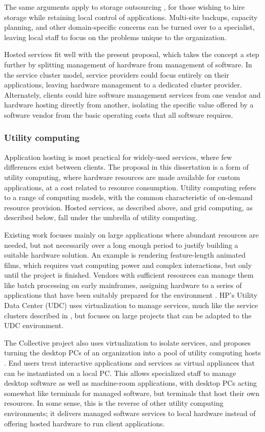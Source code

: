 The same arguments apply to storage outsourcing \cite{ng}, for those wishing to hire storage while retaining local control of applications. Multi-site backups, capacity planning, and other domain-specific concerns can be turned over to a specialist, leaving local staff to focus on the problems unique to the organization.

Hosted services fit well with the present proposal, which takes the concept a step further by splitting management of hardware from management of software. In the service cluster model, service providers could focus entirely on their applications, leaving hardware management to a dedicated cluster provider. Alternately, clients could hire software management services from one vendor and hardware hosting directly from another, isolating the specific value offered by a software vendor from the basic operating costs that all software requires.

\subsubsection{Utility computing}

Application hosting is most practical for widely-used services, where few differences exist between clients. The proposal in this dissertation is a form of utility computing, where hardware resources are made available for custom applications, at a cost related to resource consumption. Utility computing refers to a range of computing models, with the common characteristic of on-demand resource provision. Hosted services, as described above, and grid computing, as described below, fall under the umbrella of utility computing.

Existing work focuses mainly on large applications where abundant resources are needed, but not necessarily over a long enough period to justify building a suitable hardware solution. An example is rendering feature-length animated films, which requires vast computing power and complex interactions, but only until the project is finished. Vendors with sufficient resources can manage them like batch processing on early mainframes, assigning hardware to a series of applications that have been suitably prepared for the environment \cite{wilkes04}. HP's Utility Data Center (UDC) \cite{kallahalla} uses virtualization to manage services, much like the service clusters described in , but focuses on large projects that can be adapted to the UDC environment.

The Collective project also uses virtualization to isolate services, and proposes turning the desktop PCs of an organization into a pool of utility computing hosts \cite{sapuntzakis03}. End users treat interactive applications and services as virtual appliances that can be instantiated on a local PC. This allows specialized staff to manage desktop software as well as machine-room applications, with desktop PCs acting somewhat like terminals for managed software, but terminals that host their own resources. In some sense, this is the reverse of other utility computing environments; it delivers managed software services to local hardware instead of offering hosted hardware to run client applications.

